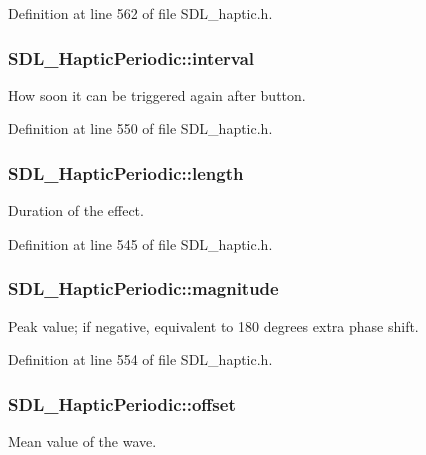 Definition at line 562 of file S\-D\-L\-\_\-haptic.\-h.

\hypertarget{struct_s_d_l___haptic_periodic_a076d266e917098d89b2385b631629162}{
\subsubsection[{interval}]{ S\-D\-L\-\_\-\-Haptic\-Periodic\-::interval}}\label{struct_s_d_l___haptic_periodic_a076d266e917098d89b2385b631629162}
How soon it can be triggered again after button. 

Definition at line 550 of file S\-D\-L\-\_\-haptic.\-h.

\hypertarget{struct_s_d_l___haptic_periodic_a0ef0b17c54aaa5c99886c2a618444026}{
\subsubsection[{length}]{ S\-D\-L\-\_\-\-Haptic\-Periodic\-::length}}\label{struct_s_d_l___haptic_periodic_a0ef0b17c54aaa5c99886c2a618444026}
Duration of the effect. 

Definition at line 545 of file S\-D\-L\-\_\-haptic.\-h.

\hypertarget{struct_s_d_l___haptic_periodic_aad0ad2b00c7e6959da627663d91f7b94}{
\subsubsection[{magnitude}]{ S\-D\-L\-\_\-\-Haptic\-Periodic\-::magnitude}}\label{struct_s_d_l___haptic_periodic_aad0ad2b00c7e6959da627663d91f7b94}
Peak value; if negative, equivalent to 180 degrees extra phase shift. 

Definition at line 554 of file S\-D\-L\-\_\-haptic.\-h.

\hypertarget{struct_s_d_l___haptic_periodic_abc7aa9e9c0d546cb54189a7812fbe554}{
\subsubsection[{offset}]{ S\-D\-L\-\_\-\-Haptic\-Periodic\-::offset}}\label{struct_s_d_l___haptic_periodic_abc7aa9e9c0d546cb54189a7812fbe554}
Mean value of the wave. 

